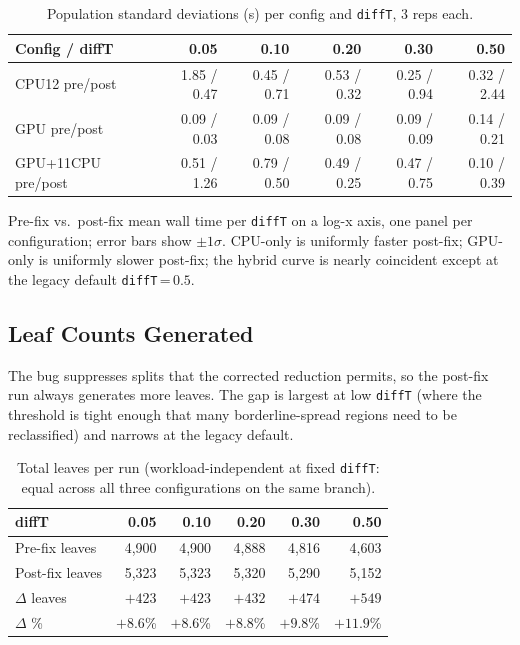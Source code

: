 \documentclass[
	english,
	letterpaper, oneside
]{article}
\begin{document}
\begin{table}[H]
    \centering
    \caption{Population standard deviations (s) per config and
             \texttt{diffT}, 3 reps each.}
    \label{tab:std}
    \begin{tabular}{lrrrrr}
        \hline
        Config / diffT & 0.05 & 0.10 & 0.20 & 0.30 & 0.50 \\
        \hline
        CPU12 pre/post      & 1.85 / 0.47 & 0.45 / 0.71 & 0.53 / 0.32 & 0.25 / 0.94 & 0.32 / 2.44 \\
        GPU pre/post        & 0.09 / 0.03 & 0.09 / 0.08 & 0.09 / 0.08 & 0.09 / 0.09 & 0.14 / 0.21 \\
        GPU+11CPU pre/post  & 0.51 / 1.26 & 0.79 / 0.50 & 0.49 / 0.25 & 0.47 / 0.75 & 0.10 / 0.39 \\
        \hline
    \end{tabular}
\end{table}

            {Pre-fix vs.\ post-fix mean wall time per \texttt{diffT} on
             a log-x axis, one panel per configuration; error bars
             show $\pm 1\sigma$. CPU-only is uniformly faster
             post-fix; GPU-only is uniformly slower post-fix; the
             hybrid curve is nearly coincident except at the legacy
             default \texttt{diffT}\,=\,$0.5$. \label{fig:compare}}

\subsection{Leaf Counts Generated}

The bug suppresses splits that the corrected reduction permits, so
the post-fix run always generates more leaves. The gap is largest at
low \texttt{diffT} (where the threshold is tight enough that many
borderline-spread regions need to be reclassified) and narrows at the
legacy default.

\begin{table}[H]
    \centering
    \caption{Total leaves per run (workload-independent at fixed
             \texttt{diffT}: equal across all three configurations on
             the same branch).}
    \label{tab:leaves}
    \begin{tabular}{lrrrrr}
        \hline
        diffT & 0.05 & 0.10 & 0.20 & 0.30 & 0.50 \\
        \hline
        Pre-fix leaves   & 4{,}900 & 4{,}900 & 4{,}888 & 4{,}816 & 4{,}603 \\
        Post-fix leaves  & 5{,}323 & 5{,}323 & 5{,}320 & 5{,}290 & 5{,}152 \\
        $\Delta$ leaves  & $+423$ & $+423$ & $+432$ & $+474$ & $+549$ \\
        $\Delta$ \%      & $+8.6$\% & $+8.6$\% & $+8.8$\% & $+9.8$\% & $+11.9$\% \\
        \hline
    \end{tabular}
\end{table}
\end{document}
